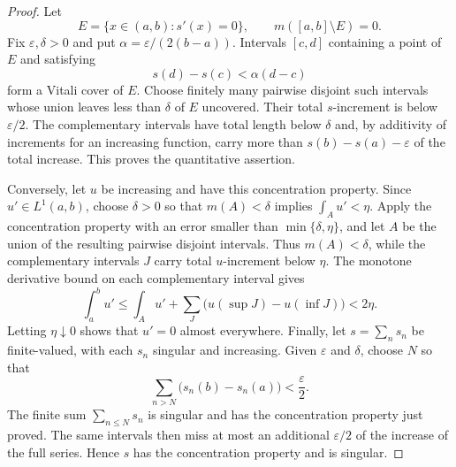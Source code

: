 \begin{proof}
Let
\[
E=\{x\in(a,b):s'(x)=0\},
\qquad m([a,b]\setminus E)=0.
\]
Fix $\varepsilon,\delta>0$ and put $\alpha=\varepsilon/(2(b-a))$. Intervals $[c,d]$ containing a point of $E$ and satisfying
\[
s(d)-s(c)<\alpha(d-c)
\]
form a Vitali cover of $E$. Choose finitely many pairwise disjoint such intervals whose union leaves less than $\delta$ of $E$ uncovered. Their total $s$-increment is below $\varepsilon/2$. The complementary intervals have total length below $\delta$ and, by additivity of increments for an increasing function, carry more than $s(b)-s(a)-\varepsilon$ of the total increase. This proves the quantitative assertion.

Conversely, let $u$ be increasing and have this concentration property. Since $u'\in L^1(a,b)$, choose $\delta>0$ so that $m(A)<\delta$ implies $\int_Au'<\eta$. Apply the concentration property with an error smaller than $\min\{\delta,\eta\}$, and let $A$ be the union of the resulting pairwise disjoint intervals. Thus $m(A)<\delta$, while the complementary intervals $J$ carry total $u$-increment below $\eta$. The monotone derivative bound on each complementary interval gives
\[
\int_a^b u'
\leq \int_Au'+\sum_J\bigl(u(\sup J)-u(\inf J)\bigr)
<2\eta.
\]
Letting $\eta\downarrow0$ shows that $u'=0$ almost everywhere. Finally, let $s=\sum_ns_n$ be finite-valued, with each $s_n$ singular and increasing. Given $\varepsilon$ and $\delta$, choose $N$ so that
\[
\sum_{n>N}\bigl(s_n(b)-s_n(a)\bigr)<\frac{\varepsilon}{2}.
\]
The finite sum $\sum_{n\leq N}s_n$ is singular and has the concentration property just proved. The same intervals then miss at most an additional $\varepsilon/2$ of the increase of the full series. Hence $s$ has the concentration property and is singular.
\end{proof}

